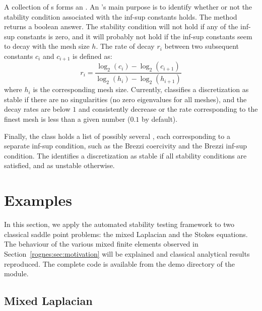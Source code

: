 A collection of s forms an
. An 's main
purpose is to identify whether or not the stability condition
associated with the inf-sup constants holds. The method
 returns a boolean answer. The stability
condition will not hold if any of the inf-sup constants is zero, and
it will probably not hold if the inf-sup constants seem to decay with
the mesh size $h$.  The rate of decay $r_i$ between two subsequent
constants $c_i$ and $c_{i+1}$ is defined as:
\begin{equation*}
  r_i = \frac{\log_2(c_i) - \log_2(c_{i+1})}{\log_2(h_i) -
    \log_2(h_{i+1})}
\end{equation*}
where $h_i$ is the corresponding mesh size. Currently, \rognesascot{}
classifies a discretization as stable if there are no singularities
(no zero eigenvalues for all meshes), and the decay rates are below
$1$ and consistently decrease or the rate corresponding to the finest
mesh is less than a given number ($0.1$ by default).

Finally, the  class holds a list of
possibly several , each
corresponding to a separate inf-sup condition, such as the Brezzi
coercivity and the Brezzi inf-sup condition. The
 identifies a discretization as
stable if all stability conditions are satisfied, and as unstable
otherwise.

\section{Examples}
\label{rognes:sec:examples}

In this section, we apply the automated stability testing framework to
two classical saddle point problems: the mixed Laplacian and the
Stokes equations. The behaviour of the various mixed finite elements
observed in Section~\ref{rognes:sec:motivation} will be explained and
classical analytical results reproduced. The complete code is
available from the demo directory of the \rognesascot{} module.

\subsection{Mixed Laplacian}


